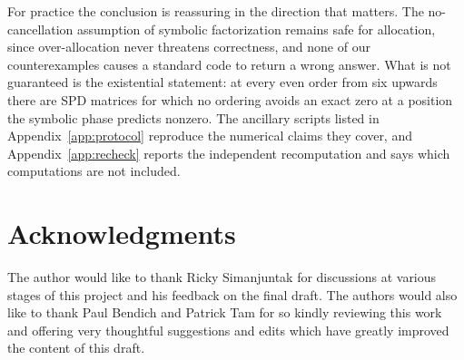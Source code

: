 \documentclass[11pt]{article}
\theoremstyle{plain}
\theoremstyle{definition}
\theoremstyle{remark}
\begin{document}
\begin{humanblock}
For practice the conclusion is reassuring in the direction that matters. The no-cancellation assumption
of symbolic factorization remains safe for allocation, since over-allocation never threatens
correctness, and none of our counterexamples causes a standard code to return a wrong answer. What is
not guaranteed is the existential statement: at every even order from six upwards there are SPD matrices for which no
ordering avoids an exact zero at a position the symbolic phase predicts nonzero. The ancillary
scripts listed in Appendix~\ref{app:protocol} reproduce the numerical claims they cover, and
Appendix~\ref{app:recheck} reports the independent recomputation and says which computations are not
included.
\end{humanblock}

\section*{Acknowledgments}

The author would like to thank Ricky Simanjuntak for discussions at various stages of this project and his feedback on the final draft. The authors would also like to thank Paul Bendich and Patrick Tam for so kindly reviewing this work and offering very thoughtful suggestions and edits which have greatly improved the content of this draft. 


\appendix
\end{document}
